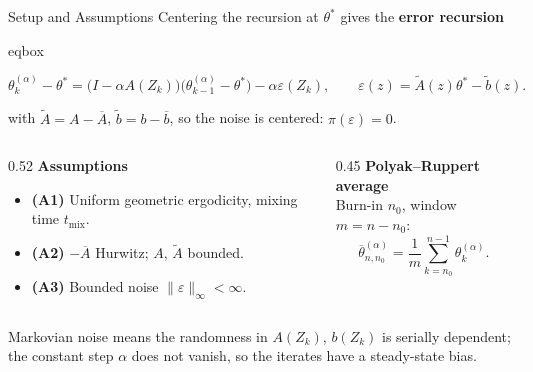 \documentclass[11pt,aspectratio=169,xcolor=table]{beamer}
\newcommand{\tealaccent}[1]{\textcolor{ThesisTeal}{\bfseries #1}}
\newcommand{\colhead}[1]{\textcolor{ThesisBlue}{\bfseries #1}}
\newcommand{\smallgray}[1]{{\scriptsize\color{ThesisGray}#1}}
\newcommand{\Abar}{\overline{A}}
\newcommand{\bbar}{\overline{b}}
\newcommand{\eps}{\varepsilon}
\newenvironment{eqbox}
  {\begin{beamercolorbox}[wd=\linewidth,sep=0.48em,center,rounded=true]{eqbox}%
   \begin{minipage}{0.97\linewidth}\centering}
  {\end{minipage}\end{beamercolorbox}}
\begin{document}
\begin{frame}{Setup and Assumptions}
\small
Centering the recursion at $\theta^*$ gives the \tealaccent{error recursion}

\begin{eqbox}
\[
  \theta_k^{(\alpha)}-\theta^*
  =\bigl(I-\alpha A(Z_k)\bigr)
    \bigl(\theta_{k-1}^{(\alpha)}-\theta^*\bigr)
   -\alpha\eps(Z_k),
  \qquad
  \eps(z)=\widetilde A(z)\theta^*-\widetilde b(z).
\]
\end{eqbox}

with $\widetilde A=A-\Abar$, $\widetilde b=b-\bbar$, so the noise is centered:
$\pi(\eps)=0$.

\vspace{0.45em}
\begin{columns}[T,onlytextwidth]
  \begin{column}{0.52\textwidth}
    \colhead{Assumptions}
    \begin{itemize}
      \item \textbf{(A1)} Uniform geometric ergodicity, mixing time
      $t_{\mathrm{mix}}$.
      \item \textbf{(A2)} $-\Abar$ Hurwitz; $A$, $\widetilde A$ bounded.
      \item \textbf{(A3)} Bounded noise
      $\lVert\eps\rVert_\infty<\infty$.
    \end{itemize}
  \end{column}
  \begin{column}{0.45\textwidth}
    \colhead{Polyak--Ruppert average}\\[0.15em]
    Burn-in $n_0$, window $m=n-n_0$:
    \[
      \overline\theta_{n,n_0}^{(\alpha)}
      =\frac1m\sum_{k=n_0}^{n-1}\theta_k^{(\alpha)}.
    \]
  \end{column}
\end{columns}

\vspace{0.35em}
\smallgray{Markovian noise means the randomness in $A(Z_k)$, $b(Z_k)$ is
serially dependent; the constant step $\alpha$ does not vanish, so the
iterates have a steady-state bias.}
\end{frame}
\end{document}
